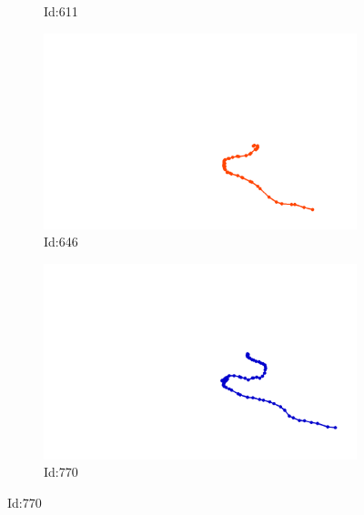 \documentclass[12pt,twoside]{report}
\begin{document}
\begin{figure}
\begin{subfigure}[b]{0.20\textwidth}
\caption{Id:611}
\end{subfigure}
\begin{subfigure}[b]{0.20\textwidth}
\centering
\includegraphics[width=\textwidth]{../../trajectories/646.png}
\caption{Id:646}
\end{subfigure}
\begin{subfigure}[b]{0.20\textwidth}
\centering
\includegraphics[width=\textwidth]{../../trajectories/770.png}
\caption{Id:770}
\end{subfigure}
\end{figure}
\end{document}
